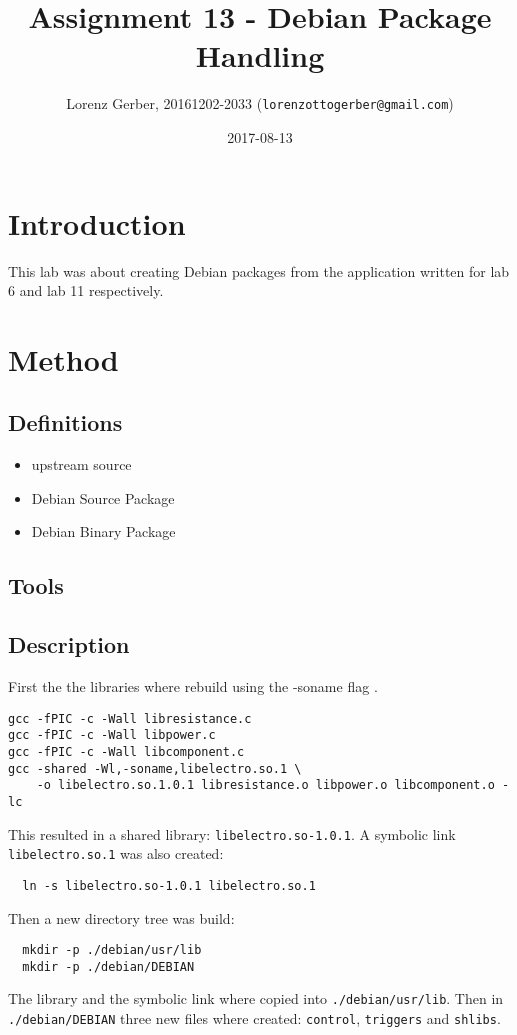 \documentclass[a4paper,11pt,twoside]{article}
\title{Assignment 13 - Debian Package Handling}
\author{Lorenz Gerber, 20161202-2033 ({\tt{lorenzottogerber@gmail.com}})}
\date{2017-08-13}
\begin{document}
\lstset{language=C}
\maketitle
\thispagestyle{empty}
\newpage

\clearpage
{}

\section{Introduction}
This lab was about creating Debian packages from the application written for
lab 6 and lab 11 respectively.

\section{Method}
\subsection{Definitions}
\begin{itemize}
  \item upstream source
  \item Debian Source Package
  \item Debian Binary Package
\end{itemize}
\subsection{Tools}
\subsection{Description}
First the the libraries where rebuild using the -soname flag \cite{tldpShlibs}.
\begin{verbatim}
gcc -fPIC -c -Wall libresistance.c
gcc -fPIC -c -Wall libpower.c
gcc -fPIC -c -Wall libcomponent.c
gcc -shared -Wl,-soname,libelectro.so.1 \
    -o libelectro.so.1.0.1 libresistance.o libpower.o libcomponent.o -lc
\end{verbatim}

This resulted in a shared library: \verb+libelectro.so-1.0.1+. A symbolic
link \verb+libelectro.so.1+ was also created:

\begin{verbatim}
  ln -s libelectro.so-1.0.1 libelectro.so.1
\end{verbatim}

Then a new directory tree was build:
\begin{verbatim}
  mkdir -p ./debian/usr/lib
  mkdir -p ./debian/DEBIAN
\end{verbatim}
The library and the symbolic link where copied into \verb+./debian/usr/lib+. Then
in \verb+./debian/DEBIAN+ three new files where created: \verb+control+,
\verb+triggers+ and \verb+shlibs+.
\end{document}
